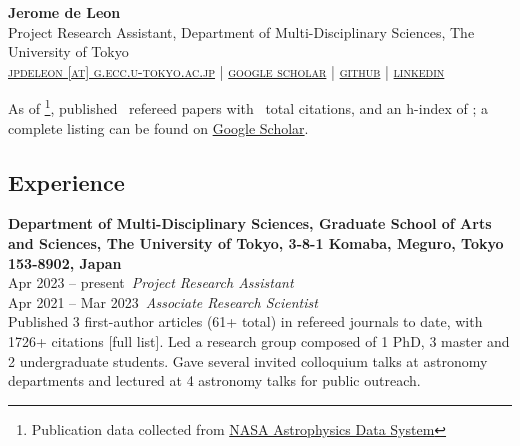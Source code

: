 \documentclass[11pt,letterpaper]{article}
\begin{document}
\thispagestyle{empty}\sloppy\sloppypar\raggedbottom

\textbf{\Large Jerome de Leon} \\[0.5ex]
Project Research Assistant, Department of Multi-Disciplinary Sciences, The University of Tokyo \\
\textsc{\small 
    \href{mailto:jpdeleon@g.ecc.u-tokyo.ac.jp}{jpdeleon [at] g.ecc.u-tokyo.ac.jp} | %
    \href{https://scholar.google.com/citations?hl=en&user=_Z8ialwAAAAJ&view_op=list_works&sortby=pubdate}{google scholar} | %
    \href{https://github.com/jpdeleon}{github} | %
    \href{https://www.linkedin.com/in/jpdeleonbsap/}{linkedin} %
}\\[0.5ex]


\vspace{1ex}
\begin{list}{}{\cvlist}
    \item As of \pubsdate\footnote{Publication data collected from \href{https://ui.adsabs.harvard.edu/}{NASA Astrophysics Data System}}, published \pubsnumber\ refereed papers with \pubscitations\ total citations, and an h-index of \pubshindex; a complete listing can be found on \href{https://scholar.google.co.jp/citations?hl=en&user=_Z8ialwAAAAJ}{Google Scholar}.
\end{list}

\subsection{Experience}

\begin{list}{}{\cvlist}
    \item
        \textbf{Department of Multi-Disciplinary Sciences, Graduate School of Arts and Sciences, The University of Tokyo, 3-8-1 Komaba, Meguro, Tokyo 153-8902, Japan} \\
        {\color{numcolor} Apr 2023 -- present}\,
        \emph{Project Research Assistant} \\
        {\color{numcolor} Apr 2021 -- Mar 2023}\,
        \emph{Associate Research Scientist} \\
        Published 3 first-author articles (61+ total) in refereed journals to date, with 1726+ citations [full list]. Led a research group composed of 1 PhD, 3 master and 2 undergraduate students. Gave several invited colloquium talks at astronomy departments and lectured at 4 astronomy talks for public outreach.
        \\[1.5ex]
\end{list}
\end{document}
